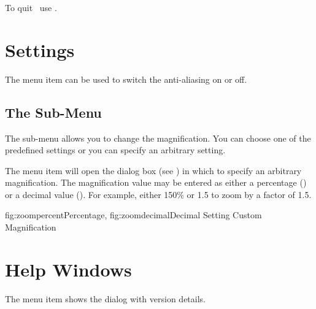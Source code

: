 
To quit \JDRView\ use .


\chapter{Settings}
\label{sec:settings}


The  menu item can be used to switch
the anti-aliasing on or off.

\section{The  Sub-Menu}
\label{sec:zoommenu}


The  sub-menu allows you to change
the magnification. You can choose one of the predefined
settings%
or you can specify an arbitrary setting.


The  menu item will open the
 dialog box (see ) in
which to specify an arbitrary magnification.  The magnification
value may be entered as either a percentage
() or a decimal value
(). For example, either 150\% or 1.5 to
zoom by a factor of 1.5. 

 {
   {fig:zoompercent}{}{Percentage},
   {fig:zoomdecimal}{}{Decimal}
 }
 {Setting Custom Magnification}


\chapter{Help Windows}
\label{sec:helpwindows}


The  menu item shows the
dialog with version details.

